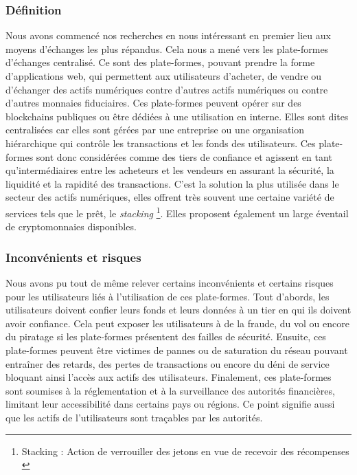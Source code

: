 \subsubsection{Définition}
Nous avons commencé nos recherches en nous intéressant en premier lieu aux moyens d'échanges les plus répandus. 
Cela nous a mené vers les plate-formes d'échanges centralisé. 
Ce sont des plate-formes, pouvant prendre la forme d'applications web, qui permettent aux utilisateurs d'acheter, de vendre ou d'échanger des actifs numériques contre d'autres actifs numériques ou contre d'autres monnaies fiduciaires. 
Ces plate-formes peuvent opérer sur des blockchains publiques ou être dédiées à une utilisation en interne. 
Elles sont dites centralisées car elles sont gérées par une entreprise ou une organisation hiérarchique qui contrôle les transactions et les fonds des utilisateurs.
Ces plate-formes sont donc considérées comme des tiers de confiance et agissent en tant qu'intermédiaires entre les acheteurs et les vendeurs en assurant la sécurité, la liquidité et la rapidité des transactions.
C'est la solution la plus utilisée dans le secteur des actifs numériques, elles offrent très souvent une certaine variété de services tels que le prêt, le \textit{stacking} \footnote{Stacking : Action de verrouiller des jetons en vue de recevoir des récompenses \cite{defStack}}.
Elles proposent également un large éventail de cryptomonnaies disponibles.

\subsubsection{Inconvénients et risques}
Nous avons pu tout de même relever certains inconvénients et certains risques pour les utilisateurs liés à l'utilisation de ces plate-formes. 
Tout d'abords, les utilisateurs doivent confier leurs fonds et leurs données à un tier en qui ils doivent avoir confiance. 
Cela peut exposer les utilisateurs à de la fraude, du vol ou encore du piratage si les plate-formes présentent des failles de sécurité. 
Ensuite, ces plate-formes peuvent être victimes de pannes ou de saturation du réseau pouvant entraîner des retards, des pertes de transactions ou encore du déni de service bloquant ainsi l'accès aux actifs des utilisateurs. 
Finalement, ces plate-formes sont soumises à la réglementation et à la surveillance des autorités financières, limitant leur accessibilité dans certains pays ou régions. 
Ce point signifie aussi que les actifs de l'utilisateurs sont traçables par les autorités. 


